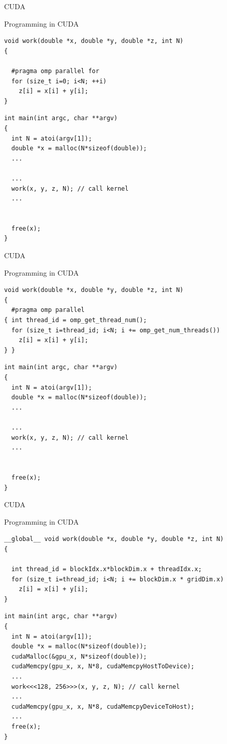 \begin{frame}[fragile]{CUDA}
 
 \begin{block}{Programming in CUDA}
  \begin{lstlisting}
void work(double *x, double *y, double *z, int N)
{

  #pragma omp parallel for
  for (size_t i=0; i<N; ++i)
    z[i] = x[i] + y[i];
}
  \end{lstlisting}
  \begin{lstlisting}
int main(int argc, char **argv)
{
  int N = atoi(argv[1]);
  double *x = malloc(N*sizeof(double));
  ...
  
  ...
  work(x, y, z, N); // call kernel
  ...
 
 
  free(x);
}  
  \end{lstlisting}
 \end{block}
\end{frame}



\begin{frame}[fragile]{CUDA}
 
 \begin{block}{Programming in CUDA}
  \begin{lstlisting}
void work(double *x, double *y, double *z, int N)
{
  #pragma omp parallel
{ int thread_id = omp_get_thread_num();
  for (size_t i=thread_id; i<N; i += omp_get_num_threads())
    z[i] = x[i] + y[i];
} }
  \end{lstlisting}
  \begin{lstlisting}
int main(int argc, char **argv)
{
  int N = atoi(argv[1]);
  double *x = malloc(N*sizeof(double));
  ...
  
  ...
  work(x, y, z, N); // call kernel
  ...
 
 
  free(x);
}  
  \end{lstlisting}
 \end{block}
\end{frame}




\begin{frame}[fragile]{CUDA}
 
 \begin{block}{Programming in CUDA}
  \begin{lstlisting}
__global__ void work(double *x, double *y, double *z, int N)
{

  int thread_id = blockIdx.x*blockDim.x + threadIdx.x;
  for (size_t i=thread_id; i<N; i += blockDim.x * gridDim.x)
    z[i] = x[i] + y[i];
}
  \end{lstlisting}
  \begin{lstlisting}
int main(int argc, char **argv)
{
  int N = atoi(argv[1]);
  double *x = malloc(N*sizeof(double));
  cudaMalloc(&gpu_x, N*sizeof(double));
  cudaMemcpy(gpu_x, x, N*8, cudaMemcpyHostToDevice);
  ...
  work<<<128, 256>>>(x, y, z, N); // call kernel
  ...
  cudaMemcpy(gpu_x, x, N*8, cudaMemcpyDeviceToHost);
  ...
  free(x);
}  
  \end{lstlisting}
 \end{block}
\end{frame}

